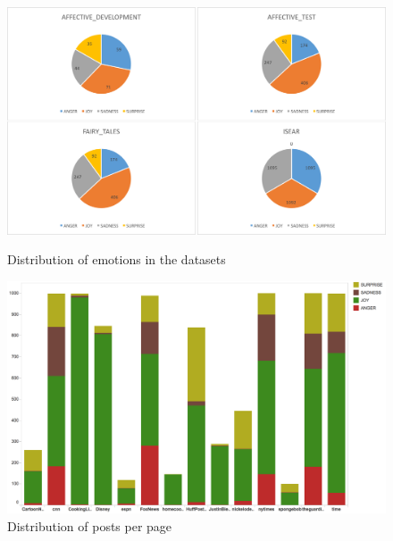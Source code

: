 \documentclass[11pt]{article}
\begin{document}
\begin{figure}[hbt]
\begin{minipage}{.48\textwidth}
  \includegraphics[scale=.145]{distribution_data.png}
  \caption{Distribution of emotions in the datasets  \label{fig:distribution_data-sets}}
\end{minipage}
\begin{minipage}{.48\textwidth}
    \includegraphics[scale=.3,keepaspectratio]{distribution_facebook.png}  
\caption{Distribution of posts per page\label{fig:distribution_facebook}}
\end{minipage}
\end{figure}


\end{document}

